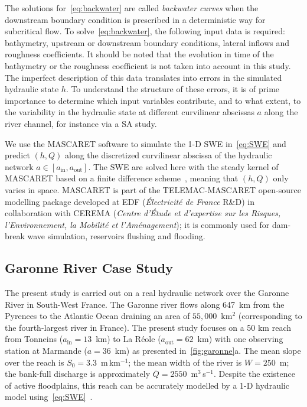 The solutions for~\cref{eq:backwater} are called {\it backwater curves} when the downstream boundary condition is prescribed in a deterministic way for subcritical flow. To solve~\cref{eq:backwater}, the following input data is required: bathymetry, upstream or downstream boundary conditions, lateral inflows and roughness coefficients. It should be noted that the evolution in time of the bathymetry or the roughness coefficient is not taken into account in this study. The imperfect description of this data translates into errors in the simulated hydraulic state $h$. To understand the structure of these errors, it is of prime importance to determine which input variables contribute, and to what extent, to the variability in the hydraulic state at different curvilinear abscissas $a$ along the river channel, for instance via a SA study.

We use the MASCARET software to simulate the 1-D SWE in~\cref{eq:SWE} and predict $(h, Q)$ along the discretized curvilinear abscissa of the hydraulic network $a \in [a_{\text{in}}, a_{\text{out}}]$. The SWE are solved here with the steady kernel of MASCARET based on a finite difference scheme~\citep{goutal2002,goutal2012}, meaning that $(h,Q)$ only varies in space. MASCARET is part of the TELEMAC-MASCARET open-source modelling package developed at EDF (\textit{Électricité de France} R\&D) in collaboration with CEREMA (\textit{Centre d'Étude et d'expertise sur les Risques, l'Environnement, la Mobilité et l'Aménagement}); it is commonly used for dam-break wave simulation, reservoirs flushing and flooding. 

\subsection{Garonne River Case Study}

The present study is carried out on a real hydraulic network over the Garonne River in South-West France. The Garonne river flows along 647~km from the Pyrenees to the Atlantic Ocean draining an area of $55,000$~km$^2$ (corresponding to the fourth-largest river in France). The present study focuses on a 50 km reach from Tonneins ($a_{\text{in}} = 13$~km) to La Réole ($a_{\text{out}} = 62$~km) with one observing station at Marmande ($a = 36$~km) as presented in~\cref{fig:garonne}a. The mean slope over the reach is $S_0 = 3.3$~m\,km$^{-1}$; the mean width of the river is $W = 250$~m; the bank-full discharge is approximately $\overline{Q} = 2550$~m$^3$\,s$^{-1}$. Despite the existence of active floodplains, this reach can be accurately modelled by a 1-D hydraulic model using~\cref{eq:SWE}~\citep{besnard2011}.

